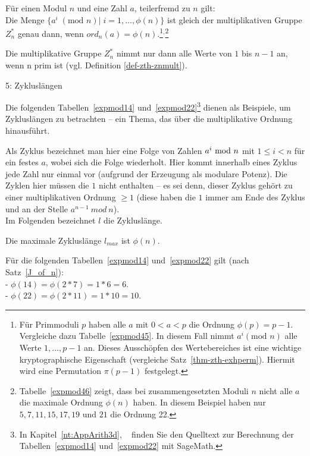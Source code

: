 \begin{refsegment}
\begin{satz}\label{thm-zth-ordp}
Für einen Modul $n$ und eine Zahl $a$,
teilerfremd zu $n$ gilt:\\
Die Menge $\{ a^i\; (\mbox{mod }n) |\; i = 1,\dots,\phi(n)\}$ ist gleich
der multiplikativen Gruppe $Z_n^*$ genau dann, wenn  $ord_n(a) = \phi(n)$.\footnote{%
    Für Primmoduli $p$ haben alle $a$ mit $0 < a < p$ die Ordnung $\phi(p) = p
    - 1$.  Vergleiche dazu Tabelle~\ref{expmod45}. In diesem Fall nimmt $a^i (\mbox{mod
    }n)$ alle Werte $1,\dots,p-1$ an. Dieses Ausschöpfen des
    Wertebereiches ist eine wichtige kryptographische
    Eigenschaft (vergleiche Satz~\ref{thm-zth-exhperm}). Hiermit wird eine
    Permutation $\pi(p-1)$ festgelegt.
}${}^,$\footnote{%
Tabelle~\ref{expmod46} zeigt, dass bei zusammengesetzten Moduli $n$ nicht alle $a$ die
maximale Ordnung $\phi(n)$ haben. In diesem Beispiel haben nur $5,7,11,15,17,19
\mbox{ und } 21$
die Ordnung 22.
}
\end{satz}
Die multiplikative Gruppe $Z_n^*$ nimmt nur dann alle Werte von $1$ bis $n-1$
an, wenn n prim ist (vgl. Definition \ref{def-zth-znmult}).




\begin{example}{ 5: Zykluslängen}

Die folgenden Tabellen~\ref{expmod14} und~\ref{expmod22}\footnote{%
  In Kapitel~\ref{nt:AppArith3d}, \glqq {}\grqq~
  finden Sie den Quelltext zur Berechnung der Tabellen~\ref{expmod14} und~\ref{expmod22}
  mit SageMath.
} dienen als Beispiele, um Zykluslängen zu betrachten -- ein
Thema, das über die multiplikative Ordnung hinausführt.

Als Zyklus bezeichnet man hier eine Folge von Zahlen $a^i{\rm ~mod~}n$
mit $1\leq i<n$ für ein festes $a$, wobei sich die Folge wiederholt. Hier kommt
innerhalb eines Zyklus jede Zahl nur einmal vor (aufgrund der Erzeugung als
modulare Potenz). Die Zyklen hier müssen die $1$ nicht enthalten -- es sei
denn, dieser Zyklus gehört zu einer multiplikativen Ordnung $\ge 1$
(diese haben die $1$ immer am Ende des Zyklus und an der Stelle
$a^{n-1} ~mod~n$).\\
 Im Folgenden bezeichnet $l$ die Zykluslänge.

 Die maximale Zykluslänge $l_{max}$ ist $\phi(n)$.

 Für die folgenden Tabellen~\ref{expmod14} und~\ref{expmod22} gilt
(nach Satz~\ref{J_of_n}):\\
\indent  - $\phi(14) = \phi(2*7) = 1*6 = 6$.\\
\indent  - $\phi(22) = \phi(2*11) = 1*10 = 10$.


\end{example}
\end{refsegment}
